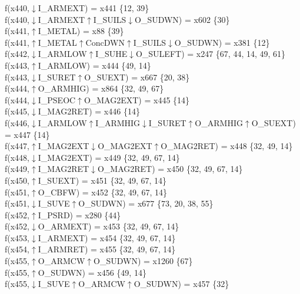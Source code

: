 f(x440,$\downarrow$I\_ARMEXT) = x441 \{12, 39\} \\  
f(x440,$\downarrow$I\_ARMEXT$\uparrow$I\_SUILS$\downarrow$O\_SUDWN) = x602 \{30\} \\  
f(x441,$\uparrow$I\_METAL) = x88 \{39\} \\  
f(x441,$\uparrow$I\_METAL$\uparrow$ConcDWN$\uparrow$I\_SUILS$\downarrow$O\_SUDWN) = x381 \{12\} \\  
f(x442,$\downarrow$I\_ARMLOW$\uparrow$I\_SUHE$\downarrow$O\_SULEFT) = x247 \{67, 44, 14, 49, 61\} \\  
f(x443,$\uparrow$I\_ARMLOW) = x444 \{49, 14\} \\  
f(x443,$\downarrow$I\_SURET$\uparrow$O\_SUEXT) = x667 \{20, 38\} \\  
f(x444,$\uparrow$O\_ARMHIG) = x864 \{32, 49, 67\} \\  
f(x444,$\downarrow$I\_PSEOC$\uparrow$O\_MAG2EXT) = x445 \{14\} \\  
f(x445,$\downarrow$I\_MAG2RET) = x446 \{14\} \\  
f(x446,$\downarrow$I\_ARMLOW$\uparrow$I\_ARMHIG$\downarrow$I\_SURET$\uparrow$O\_ARMHIG$\uparrow$O\_SUEXT) = x447 \{14\} \\  
f(x447,$\uparrow$I\_MAG2EXT$\downarrow$O\_MAG2EXT$\uparrow$O\_MAG2RET) = x448 \{32, 49, 14\} \\  
f(x448,$\downarrow$I\_MAG2EXT) = x449 \{32, 49, 67, 14\} \\  
f(x449,$\uparrow$I\_MAG2RET$\downarrow$O\_MAG2RET) = x450 \{32, 49, 67, 14\} \\  
f(x450,$\uparrow$I\_SUEXT) = x451 \{32, 49, 67, 14\} \\  
f(x451,$\uparrow$O\_CBFW) = x452 \{32, 49, 67, 14\} \\  
f(x451,$\downarrow$I\_SUVE$\uparrow$O\_SUDWN) = x677 \{73, 20, 38, 55\} \\  
f(x452,$\uparrow$I\_PSRD) = x280 \{44\} \\  
f(x452,$\downarrow$O\_ARMEXT) = x453 \{32, 49, 67, 14\} \\  
f(x453,$\downarrow$I\_ARMEXT) = x454 \{32, 49, 67, 14\} \\  
f(x454,$\uparrow$I\_ARMRET) = x455 \{32, 49, 67, 14\} \\  
f(x455,$\uparrow$O\_ARMCW$\uparrow$O\_SUDWN) = x1260 \{67\} \\  
f(x455,$\uparrow$O\_SUDWN) = x456 \{49, 14\} \\  
f(x455,$\downarrow$I\_SUVE$\uparrow$O\_ARMCW$\uparrow$O\_SUDWN) = x457 \{32\} \\  
